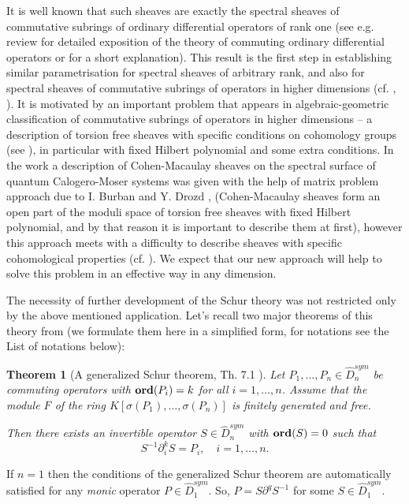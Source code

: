 \documentclass[11pt]{article}
\theoremstyle{definition}
\newcommand{\Ord}{\mathop {\rm \bf ord}}
\theoremstyle{plain}
\newtheorem{theorem}{Theorem}[section]
\numberwithin{equation}{section}
\begin{document}
It is well known  that such sheaves are exactly the spectral sheaves of commutative subrings of ordinary differential operators of rank one (see e.g. review \cite{Zheglov_book} for detailed exposition of the theory of commuting ordinary differential operators or \cite{BZ} for a short explanation). This result is the first step in establishing similar parametrisation  for spectral sheaves of arbitrary rank, and also for spectral sheaves of commutative subrings of operators in higher dimensions (cf. \cite{BurbanZheglov2017}, \cite{Zheglov_belovezha}). It is motivated by an important problem that appears in algebraic-geometric classification  of commutative subrings of operators in higher dimensions -- a description of torsion free sheaves with specific conditions on cohomology groups (see \cite{Zheglov_belovezha}), in particular with fixed Hilbert polynomial and some extra conditions. 
In the work \cite{BurbanZheglov2017} a description of Cohen-Macaulay sheaves on the spectral surface of quantum Calogero-Moser systems was given  with the help of matrix problem approach due to I. Burban and Y. Drozd \cite{SurvOnCM}, \cite{BDNonIsol} (Cohen-Macaulay sheaves form an open part of the moduli space of torsion free sheaves with fixed Hilbert polynomial, and by that reason it is important  to describe them at first), however this approach meets with a difficulty to describe sheaves with specific cohomological properties (cf. \cite[Sec. 6]{BurbanZheglov2017}). We expect that our new approach will help to solve this problem in an effective way in any dimension. 

  
The necessity of further development of the Schur theory was not restricted only by the above mentioned application. Let's recall two major theorems of this theory from \cite{A.Z} (we formulate them here in a simplified form, for notations see the List of notations below):
\begin{theorem}[A generalized Schur theorem, Th. 7.1 ]
\label{T:Schur_theorem}
Let $P_1, \ldots , P_n\in \hat{D}_n^{sym}$ be commuting operators with $\Ord (P_i)=k$ for all $i=1,\ldots ,n$.  Assume that the module $F$ of the ring $K[\sigma (P_1), \ldots , \sigma (P_n)]$ is finitely generated and free. 

Then there exists an invertible operator $S\in \hat{D}_n^{sym}$ with $\Ord (S)=0$ such that
$$
S^{-1}\partial_i^{k}S=P_i, \quad i=1, \ldots ,n. 
$$
\end{theorem}

If $n=1$ then the conditions of the generalized Schur theorem are automatically satisfied for any {\it monic} operator $P\in \hat{D}_1^{sym}$. So, $P=S\partial^q S^{-1}$ for some $S\in \hat{D}_1^{sym}$.
\end{document}
